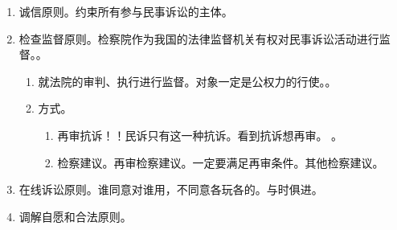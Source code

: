 \begin{enumerate}
\begin{kk}{约束性辩论原则}
\begin{enumerate}
            \item 对当事人都没有争议的事实法院应当予以认定 \yjt 受当事人自认约束 \yjt 辩论原则。
            \item 法院对证据的调查原则上仅限于当事人提出的 \yjt 辩论原则、处分原则、平等原则。
          \end{enumerate}
        \end{kk}
  \item 诚信原则。约束所有参与民事诉讼的主体。
  \item 检查监督原则。检察院作为我国的法律监督机关有权对民事诉讼活动进行监督。。
        \begin{enumerate}
          \item 就法院的审判、执行进行监督。对象一定是公权力的行使。。
          \item 方式。
                \begin{enumerate}
                  \item 再审抗诉！！民诉只有这一种抗诉。看到抗诉想再审。
                        。
                  \item 检察建议。\yi 再审检察建议。一定要满足再审条件。\er 其他检察建议。
                \end{enumerate}
        \end{enumerate}
  \item 在线诉讼原则。谁同意对谁用，不同意各玩各的。与时俱进。
  \item 调解自愿和合法原则。
\end{enumerate}
